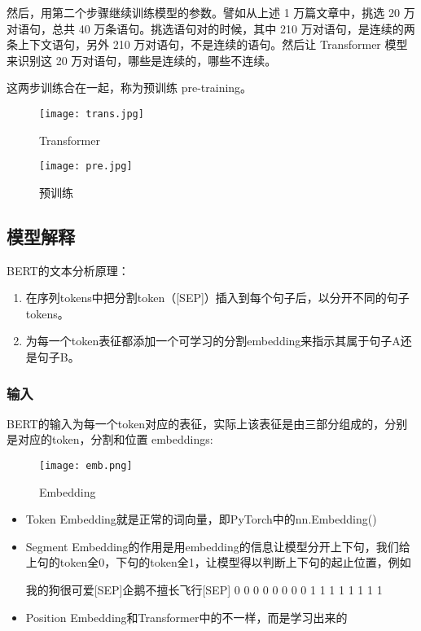 \documentclass[a4paper,AutoFakeBold,AutoFakeSlant]{ctexart}
\begin{document}
然后，用第二个步骤继续训练模型的参数。譬如从上述 1 万篇文章中，挑选 20 万对语句，总共 40 万条语句。挑选语句对的时候，其中 210 万对语句，是连续的两条上下文语句，另外 210 万对语句，不是连续的语句。然后让 Transformer 模型来识别这 20 万对语句，哪些是连续的，哪些不连续。

这两步训练合在一起，称为预训练 pre-training。
\begin{figure}[htbp]
    \centering
    \begin{minipage}[t]{0.48\textwidth}
    \centering
    \texttt{[image: trans.jpg]}
    \caption{Transformer}
    \label{f1}
    \end{minipage}
    \begin{minipage}[t]{0.48\textwidth}
    \centering
    \texttt{[image: pre.jpg]}
    \caption{预训练}
    \label{f2}
    \end{minipage}
\end{figure}

\subsection{模型解释}
BERT的文本分析原理：
\begin{enumerate}
    \item 在序列tokens中把分割token（[SEP]）插入到每个句子后，以分开不同的句子tokens。
    \item 为每一个token表征都添加一个可学习的分割embedding来指示其属于句子A还是句子B。
\end{enumerate}

\subsubsection{输入}
BERT的输入为每一个token对应的表征，实际上该表征是由三部分组成的，分别是对应的token，分割和位置 embeddings:

\begin{figure}[htbp]
    \centering
    \texttt{[image: emb.png]}
    \caption{Embedding}
    \label{f3}
\end{figure}
\begin{itemize}
    \item Token Embedding就是正常的词向量，即PyTorch中的nn.Embedding()
    \item Segment Embedding的作用是用embedding的信息让模型分开上下句，我们给上句的token全0，下句的token全1，让模型得以判断上下句的起止位置，例如
    \begin{python}
    [CLS]我的狗很可爱[SEP]企鹅不擅长飞行[SEP]
     0   0 0 0 0 0 0 0  1 1 1 1 1 1 1 1
    \end{python}
    \item Position Embedding和Transformer中的不一样，而是学习出来的
\end{itemize}
\end{document}
